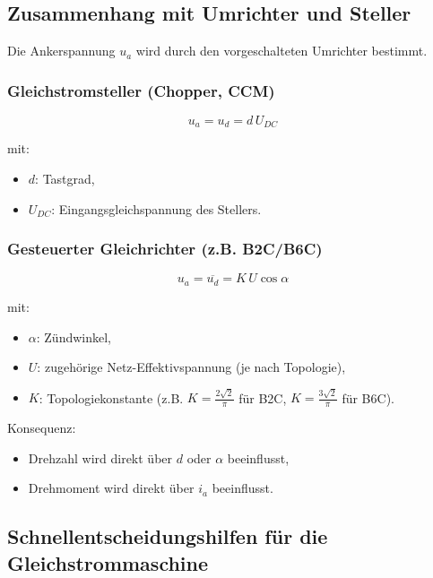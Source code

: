 
\subsection{Zusammenhang mit Umrichter und Steller}

Die Ankerspannung $u_a$ wird durch den vorgeschalteten Umrichter bestimmt.

\subsubsection{Gleichstromsteller (Chopper, CCM)}

\[
\boxed{u_a=u_d=d\,U_{DC}}
\]

mit:
\begin{itemize}
\item $d$: Tastgrad,
\item $U_{DC}$: Eingangsgleichspannung des Stellers.
\end{itemize}

\subsubsection{Gesteuerter Gleichrichter (z.B. B2C/B6C)}

\[
\boxed{u_a=\overline{u_d}=K\,U\cos\alpha}
\]

mit:
\begin{itemize}
\item $\alpha$: Zündwinkel,
\item $U$: zugehörige Netz-Effektivspannung (je nach Topologie),
\item $K$: Topologiekonstante (z.B. $K=\frac{2\sqrt{2}}{\pi}$ für B2C, $K=\frac{3\sqrt{2}}{\pi}$ für B6C).
\end{itemize}

Konsequenz:
\begin{itemize}
    \item Drehzahl wird direkt über $d$ oder $\alpha$ beeinflusst,
    \item Drehmoment wird direkt über $i_a$ beeinflusst.
\end{itemize}

\subsection{Schnellentscheidungshilfen für die Gleichstrommaschine}

